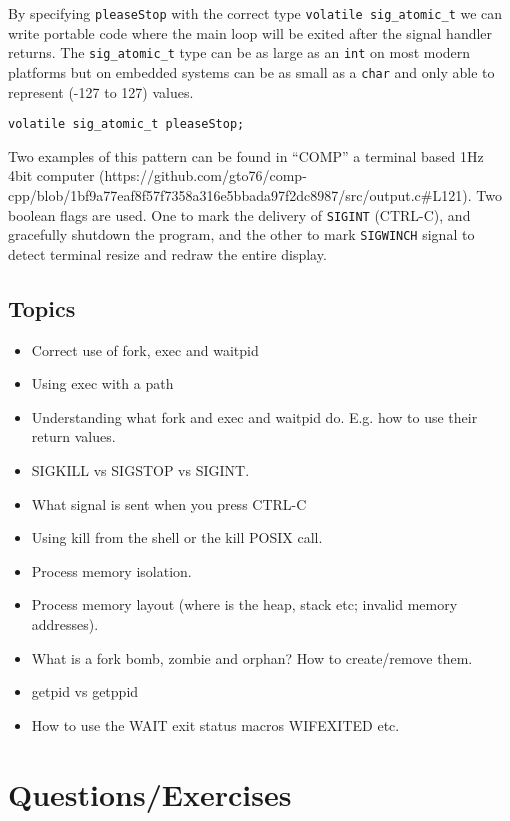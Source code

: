 By specifying \texttt{pleaseStop} with the correct type
\texttt{volatile\ sig\_atomic\_t} we can write portable code where the
main loop will be exited after the signal handler returns. The
\texttt{sig\_atomic\_t} type can be as large as an \texttt{int} on most
modern platforms but on embedded systems can be as small as a
\texttt{char} and only able to represent (-127 to 127) values.

\begin{verbatim}
volatile sig_atomic_t pleaseStop;
\end{verbatim}

Two examples of this pattern can be found in ``COMP'' a terminal based
1Hz 4bit computer
(https://github.com/gto76/comp-cpp/blob/1bf9a77eaf8f57f7358a316e5bbada97f2dc8987/src/output.c\#L121).
Two boolean flags are used. One to mark the delivery of \texttt{SIGINT}
(CTRL-C), and gracefully shutdown the program, and the other to mark
\texttt{SIGWINCH} signal to detect terminal resize and redraw the entire
display.

\subsection{Topics}\label{topics}

\begin{itemize}
\tightlist
\item
  Correct use of fork, exec and waitpid
\item
  Using exec with a path
\item
  Understanding what fork and exec and waitpid do. E.g. how to use their
  return values.
\item
  SIGKILL vs SIGSTOP vs SIGINT.
\item
  What signal is sent when you press CTRL-C
\item
  Using kill from the shell or the kill POSIX call.
\item
  Process memory isolation.
\item
  Process memory layout (where is the heap, stack etc; invalid memory
  addresses).
\item
  What is a fork bomb, zombie and orphan? How to create/remove them.
\item
  getpid vs getppid
\item
  How to use the WAIT exit status macros WIFEXITED etc.
\end{itemize}

\section{Questions/Exercises}\label{questionsexercises}


